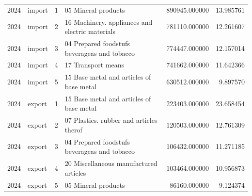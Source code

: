 \begin{tabular}{rlrlrr}
2024 & import & 1 & 05 Mineral products & 890945.000000 & 13.985761 \\
2024 & import & 2 & 16 Machinery. appliances and electric materials & 781110.000000 & 12.261607 \\
2024 & import & 3 & 04 Prepared foodstufs beverageas and tobacco & 774447.000000 & 12.157014 \\
2024 & import & 4 & 17 Transport means & 741662.000000 & 11.642366 \\
2024 & import & 5 & 15 Base metal and articles of base metal & 630512.000000 & 9.897570 \\
2024 & export & 1 & 15 Base metal and articles of base metal & 223403.000000 & 23.658454 \\
2024 & export & 2 & 07 Plastics. rubber and articles therof & 120503.000000 & 12.761309 \\
2024 & export & 3 & 04 Prepared foodstufs beverageas and tobacco & 106432.000000 & 11.271185 \\
2024 & export & 4 & 20 Miscellaneous manufactured articles & 103464.000000 & 10.956873 \\
2024 & export & 5 & 05 Mineral products & 86160.000000 & 9.124374 \\
\bottomrule
\end{tabular}
